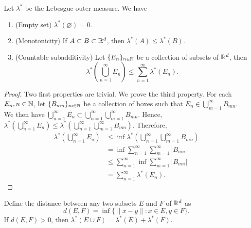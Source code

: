 \begin{proposition}
  Let $\lambda^*$ be the Lebesgue outer measure. We have
  \begin{enumerate}[label = (\arabic*)]
    \item (Empty set) $\lambda^*(\varnothing) = 0$.
    \item (Monotonicity) If $A\subset B\subset \mathbb{R}^d$, then $\lambda^*(A)\le\lambda^*(B)$.
    \item (Countable subadditivity) Let $\{E_n\}_{n\in\mathbb{N}}$ be a collection of subsets of $\mathbb{R}^d$, then
          $$\lambda^*(\bigcup\limits_{n=1}^{\infty}E_n) \le\sum \limits_{n=1}^{\infty}\lambda^*(E_n).$$
  \end{enumerate}
\end{proposition}

\begin{proof}
  Two first properties are trivial. We prove the third property. For each $E_n, n\in \mathbb{N}$, let $\{B_{mn}\}_{m\in\mathbb{N}}$ be a collection of boxes such that $E_n\in \bigcup\limits_{m=1}^{\infty} B_{mn}$. We then have $\bigcup\limits_{n=1}^{\infty} E_n \subset \bigcup\limits_{n=1}^{\infty}\bigcup\limits_{m=1}^{\infty} B_{mn}$. Hence, $\lambda^*\left(\bigcup\limits_{n=1}^{\infty} E_n\right) \le \lambda^*\left(\bigcup\limits_{n=1}^{\infty}\bigcup\limits_{m=1}^{\infty} B_{mn}\right)$. Therefore,
  \begin{align*}
    \lambda^*\left(\bigcup\limits_{n=1}^{\infty} E_n\right)
     & \le \inf\lambda^*\left(\bigcup\limits_{n=1}^{\infty}\bigcup\limits_{m=1}^{\infty} B_{mn}\right) \\
     & = \inf\sum\limits_{n=1}^{\infty}\sum\limits_{m=1}^{\infty} |B_{mn}                              \\
     & \le \sum\limits_{n=1}^{\infty}\inf\sum\limits_{m=1}^{\infty} |B_{mn}|                           \\
     & = \sum\limits_{n=1}^{\infty}\lambda^*(E_n).
  \end{align*}
\end{proof}

\begin{lemma}
  \label{lemma:separated-sets}
  Define the distance between any two subsets $E$ and $F$ of $\mathbb{R}^d$ as
  \begin{equation}
    d(E, F) = \inf\{\|x-y\| : x\in E, y\in F\}.
  \end{equation}
  If $d(E,F) > 0$, then $\lambda^*(E\cup F) = \lambda^*(E) + \lambda^*(F)$.
\end{lemma}

